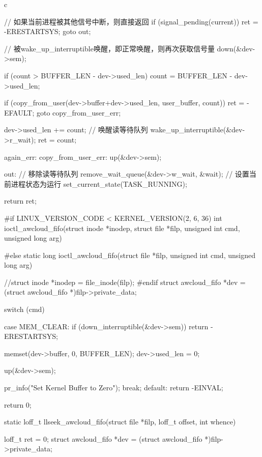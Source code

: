 \begin{code-block}{c}
{{                // 如果当前进程被其他信号中断，则直接返回
                if (signal_pending(current)) {
                        ret = -ERESTARTSYS;
                        goto out;
                }

                // 被wake_up_interruptible唤醒，即正常唤醒，则再次获取信号量
                down(&dev->sem);
        }

        if (count > BUFFER_LEN - dev->used_len) {
                count = BUFFER_LEN - dev->used_len;
        }

        if (copy_from_user(dev->buffer+dev->used_len, user_buffer, count)) {
                ret = -EFAULT;
                goto copy_from_user_err;
        }

        dev->used_len += count;
        // 唤醒读等待队列
        wake_up_interruptible(&dev->r_wait);
        ret = count;

again_err:
copy_from_user_err:
        up(&dev->sem);

out:
        // 移除读等待队列
        remove_wait_queue(&dev->w_wait, &wait);
        // 设置当前进程状态为运行
        set_current_state(TASK_RUNNING);

        return ret;
}

#if LINUX_VERSION_CODE < KERNEL_VERSION(2, 6, 36)
int ioctl_awcloud_fifo(struct inode *inodep,
        struct file *filp, unsigned int cmd, unsigned long arg)
{
#else
static long ioctl_awcloud_fifo(struct file *filp,
        unsigned int cmd, unsigned long arg)
{
        //struct inode *inodep = file_inode(filp);
#endif
        struct awcloud_fifo *dev = (struct awcloud_fifo *)filp->private_data;

        switch (cmd) {
        case MEM_CLEAR:
                if (down_interruptible(&dev->sem)) {
                        return -ERESTARTSYS;
                }

                memset(dev->buffer, 0, BUFFER_LEN);
                dev->used_len = 0;

                up(&dev->sem);

                pr_info("Set Kernel Buffer to Zero\n");
                break;
        default:
                return -EINVAL;
        }
        return 0;
}

static loff_t llseek_awcloud_fifo(struct file *filp,
        loff_t offset, int whence)
{
        loff_t ret = 0;
        struct awcloud_fifo *dev = (struct awcloud_fifo *)filp->private_data;

}}
\end{code-block}
